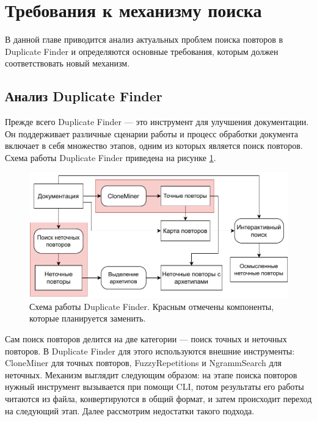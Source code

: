 \documentclass[14pt]{matmex-diploma-custom}
\begin{document}
\section{Требования к механизму поиска}

В данной главе приводится анализ актуальных проблем поиска повторов в Duplicate Finder и определяются основные требования, которым должен соответствовать новый механизм.

\subsection{Анализ Duplicate Finder}

Прежде всего Duplicate Finder --- это инструмент для улучшения документации. Он поддерживает различные сценарии работы и процесс обработки документа включает в себя множество этапов, одним из которых является поиск повторов. Схема работы Duplicate Finder приведена на рисунке \ref{fig:DuplicateFinder}.

\begin{figure}[h]
	\includegraphics[scale=0.95]{pictures/DuplicateFinder.pdf}
	\centering
	\caption{Схема работы Duplicate Finder. Красным отмечены компоненты, которые планируется заменить.}
	\label{fig:DuplicateFinder}
\end{figure}

Сам поиск повторов делится на две категории --- поиск точных и неточных повторов. В Duplicate Finder для этого используются внешние инструменты: CloneMiner \cite{bib:tool:CloneMiner} для точных повторов, FuzzyRepetitions \cite{bib:tool:FuzzySearch} и NgrammSearch \cite{bib:tool:ImprovedNgramSearch} для неточных. Механизм выглядит следующим образом: на этапе поиска повторов нужный инструмент вызывается при помощи CLI, потом результаты его работы читаются из файла, конвертируются в общий формат, и затем происходит переход на следующий этап. Далее рассмотрим недостатки такого подхода.
\end{document}
